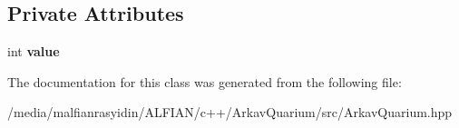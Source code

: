 \subsection*{Private Attributes}
\begin{DoxyCompactItemize}
\item 
\mbox{\label{class_coin_a3273e38e55be31a1c123fc0a46820467}} 
int {\bfseries value}
\end{DoxyCompactItemize}


The documentation for this class was generated from the following file\+:\begin{DoxyCompactItemize}
\item 
/media/malfianrasyidin/\+A\+L\+F\+I\+A\+N/c++/\+Arkav\+Quarium/src/Arkav\+Quarium.\+hpp\end{DoxyCompactItemize}
